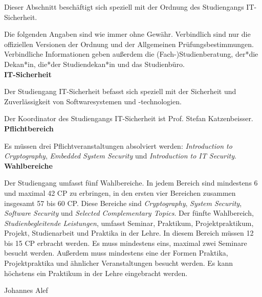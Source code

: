 {Dieser Abschnitt beschäftigt sich speziell mit der Ordnung des Studiengangs IT-Sicherheit.
}{
Die folgenden Angaben sind wie immer ohne Gewähr. Verbindlich sind nur die offiziellen Versionen der Ordnung und der Allgemeinen Prüfungsbestimmungen. Verbindliche Informationen geben außerdem die (Fach-)Studienberatung, der*die Dekan*in, die*der Studiendekan*in und das Studienbüro.\\

\noindent\textbf{IT-Sicherheit}

Der Studiengang IT-Sicherheit befasst sich speziell mit der Sicherheit und Zuverlässigkeit von Softwaresystemen und -technologien.

Der Koordinator des Studiengangs IT-Sicherheit ist Prof. Stefan Katzenbeisser.\\

\noindent\textbf{Pflichtbereich}

Es müssen drei Pflichtveranstaltungen absolviert werden: \textit{Introduction to Cryptography}, \textit{Embedded System Security} und \textit{Introduction to IT Security}.\\

\noindent\textbf{Wahlbereiche}

Der Studiengang umfasst fünf Wahlbereiche. In jedem Bereich sind mindestens 6 und maximal 42 CP zu erbringen, in den ersten vier Bereichen zusammen insgesamt 57 bis 60 CP. Diese Bereiche sind \textit{Cryptography}, \textit{System Security}, \textit{Software Security} und \textit{Selected Complementary Topics}. Der fünfte Wahlbereich, \textit{Studienbegleitende Leistungen}, umfasst Seminar, Praktikum, Projektpraktikum, Projekt, Studienarbeit und Praktika in der Lehre. In diesem Bereich müssen 12 bis 15 CP erbracht werden. Es muss mindestens eins, maximal zwei Seminare besucht werden. Außerdem muss mindestens eine der Formen Praktika, Projektpraktika und ähnlicher Veranstaltungen besucht werden. Es kann höchstens ein Praktikum in der Lehre eingebracht werden.\\

}
{Johannes Alef}
